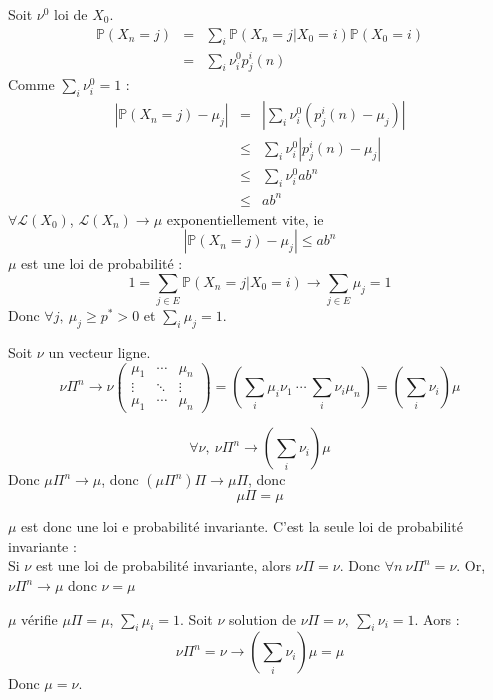 \begin{dem}
\bigskip
Soit $\nu^0$ loi de $X_0$.\\
\begin{eqnarray*}
\mathbb{P}(X_n=j)&=&\sum_i \mathbb{P}(X_n=j|X_0=i)\mathbb{P}(X_0=i) \\
		&=& \sum_i \nu_i^0 p_j^i(n)
\end{eqnarray*}
Comme $\sum_i \nu_i^0=1$ :
\begin{eqnarray*}
|\mathbb{P}(X_n=j)-\mu_j|&=&\left| \sum_i \nu_i^0 (p^i_j(n)-\mu_j)\right|\\
			&\leq&\sum_i \nu_i^0 |p_j^i(n)-\mu_j| \\
			&\leq&\sum_i \nu_i^0 ab^n\\
			&\leq& ab^n
\end{eqnarray*}
$\forall \mathcal{L}(X_0)$, $\mathcal{L}(X_n)\to\mu$ exponentiellement vite, ie \[|\mathbb{P}(X_n=j)-\mu_j|\leq ab^n\]
$\mu$ est une loi de probabilité :
\[1=\sum_{j\in E} \mathbb{P}(X_n=j|X_0=i) \to \sum_{j\in E} \mu_j = 1\]
Donc $\forall j,\ \mu_j\geq p^*>0$ et $\sum_i \mu_j=1$.

\bigskip
Soit $\nu$ un vecteur ligne.
\[\nu\Pi^n \to \nu \begin{pmatrix} \mu_1 & \cdots & \mu_n \\ \vdots & \ddots & \vdots \\ \mu_1 & \cdots & \mu_n \end{pmatrix} = \left( \sum_i \mu_i \nu_1\ \cdots\ \sum_i \nu_i \mu_n \right) = \left( \sum_i \nu_i \right) \mu\]

\[\forall \nu,\ \nu\Pi^n \to \left( \sum_i \nu_i \right) \mu\]
Donc $\mu\Pi^n\to \mu$, donc $\left( \mu\Pi^n\right) \Pi \to \mu\Pi$, donc \[\mu\Pi=\mu\]

$\mu$ est donc une loi e probabilité invariante. C'est la seule loi de probabilité invariante :\\
Si $\nu$ est une loi de probabilité invariante, alors $\nu\Pi=\nu$. Donc $\forall n\ \nu\Pi^n=\nu$. Or, $\nu\Pi^n\to \mu$ donc $\nu=\mu$

\bigskip
$\mu$ vérifie $\mu\Pi=\mu$, $\sum_i \mu_i =1$. Soit $\nu$ solution de $\nu\Pi=\nu,\ \sum_i \nu_i=1$. Aors :
\[\nu \Pi^n = \nu \to \left(\sum_i \nu_i\right) \mu = \mu\]
Donc $\mu=\nu$.
\end{dem}

